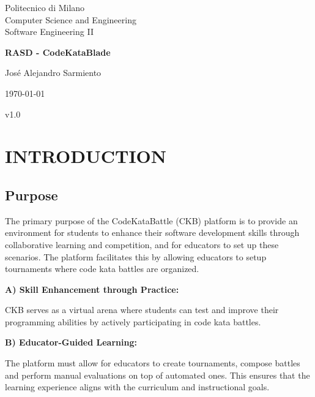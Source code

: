 \documentclass{article}
\begin{document}
\begin{titlepage}
    \begin{center}
        
        Politecnico di Milano\\
      
        Computer Science and Engineering\\
        
        Software Engineering II\\

        \vfill
        
        {\Large \textbf{RASD - CodeKataBlade}}\\
        
        \vfill

        José Alejandro Sarmiento

        \today

        v1.0
        
    \end{center}
\end{titlepage}
\newpage


\tableofcontents


\section{INTRODUCTION}
\subsection{Purpose}

The primary purpose of the CodeKataBattle (CKB) platform is to provide an environment 
for students to enhance their software development skills through collaborative 
learning and competition, and for educators to set up these scenarios. The platform facilitates 
this by allowing educators to setup tournaments where code kata battles are organized.

\textbf{A) Skill Enhancement through Practice:}

CKB serves as a virtual arena where students can test and improve their programming abilities by actively 
participating in code kata battles.

\textbf{B) Educator-Guided Learning:}

The platform must allow for educators to create tournaments, compose battles and perform manual evaluations
on top of automated ones. This ensures that the learning experience aligns with the curriculum and instructional goals.
\end{document}
